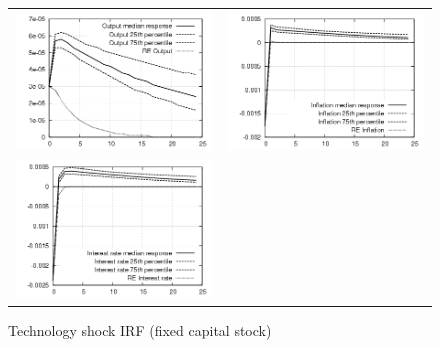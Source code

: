 \documentclass{beamer}
\begin{document}
\frame
{
\begin{figure}[ht]
\caption{Technology shock IRF (fixed capital stock)}
\begin{center}
\begin{tabular}{cc}
\includegraphics[scale=0.3]{plots/outputirf_znok.png} &
\includegraphics[scale=0.3]{plots/inflationirf_znok.png} \\
\includegraphics[scale=0.3]{plots/interestirf_znok.png} \\
\end{tabular}
\end{center}
\end{figure}
}
\end{document}
